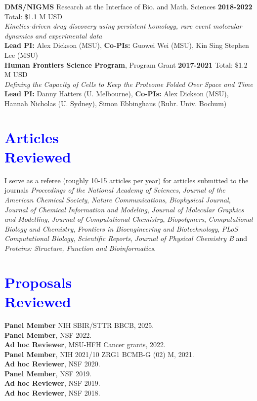 \documentclass[margin,line]{res}
\begin{document}
\begin{resume}
{\bf DMS/NIGMS} Research at the Interface of Bio. and Math. Sciences \hfill {\bf 2018-2022} Total: \$1.1 M USD \\
 \emph{Kinetics-driven drug discovery using persistent homology, rare event molecular dynamics and experimental data}\\
 {\bf Lead PI:} Alex Dickson (MSU), {\bf Co-PIs:} Guowei Wei (MSU), Kin Sing Stephen Lee (MSU)\\

{\bf Human Frontiers Science Program}, Program Grant \hfill {\bf 2017-2021} Total: \$1.2 M USD \\
 \emph{Defining the Capacity of Cells to Keep the Proteome Folded Over Space and Time}\\
 {\bf Lead PI:} Danny Hatters (U. Melbourne), {\bf Co-PIs:} Alex Dickson (MSU), Hannah Nicholas (U. Sydney), Simon Ebbinghaus (Ruhr. Univ. Bochum) \\

\section{\sc \textcolor{blue}{ Articles \\ Reviewed}}
I serve as a referee (roughly 10-15 articles per year) for articles submitted to the journals \textit{Proceedings of the National Academy of Sciences}, \textit{Journal of the American Chemical Society}, \textit{Nature Communications}, \textit{Biophysical Journal}, \textit{Journal of Chemical Information and Modeling}, \textit{Journal of Molecular Graphics and Modelling}, \textit{Journal of Computational Chemistry}, \textit{Biopolymers}, \textit{Computational Biology and Chemistry}, \textit{Frontiers in Bioengineering and Biotechnology}, \textit{PLoS Computational Biology}, \textit{Scientific Reports}, \textit{Journal of Physical Chemistry B} and \textit{Proteins: Structure, Function and Bioinformatics}.

\section{\sc \textcolor{blue}{ Proposals \\ Reviewed}}
{\bf Panel Member} NIH \hfill SBIR/STTR BBCB, 2025. \\
{\bf Panel Member}, NSF \hfill 2022.\\
{\bf Ad hoc Reviewer}, MSU-HFH \hfill Cancer grants, 2022. \\
{\bf Panel Member}, NIH \hfill 2021/10 ZRG1 BCMB-G (02) M, 2021. \\
{\bf Ad hoc Reviewer}, NSF \hfill 2020. \\
{\bf Panel Member}, NSF \hfill 2019.\\
{\bf Ad hoc Reviewer}, NSF \hfill 2019. \\
{\bf Ad hoc Reviewer}, NSF \hfill 2018. \\


\end{resume}
\end{document}
